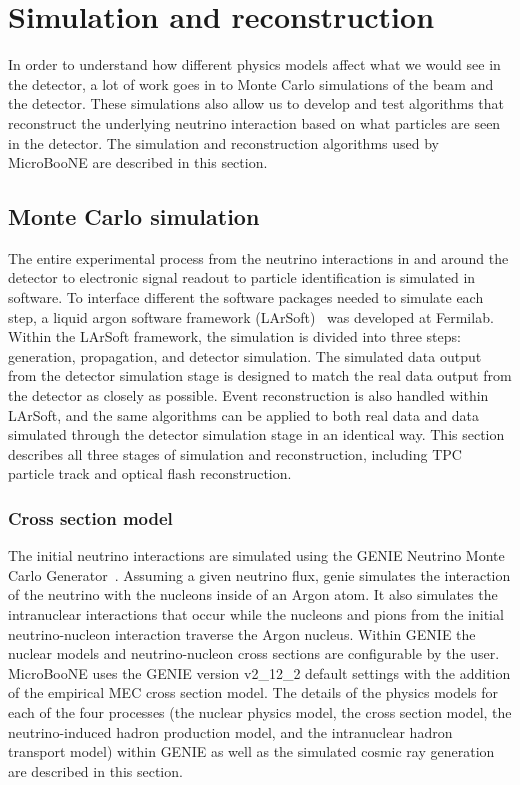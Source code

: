 \section{Simulation and reconstruction}\label{sc:simreco}
In order to understand how different physics models affect what we would see in
the detector, a lot of work goes in to Monte Carlo simulations of the beam and
the detector. These simulations also allow us to develop and test algorithms
that reconstruct the underlying neutrino interaction based on what particles
are seen in the detector. The simulation and reconstruction algorithms used by
MicroBooNE are described in this section.


\subsection{Monte Carlo simulation}\label{sec:simulation}
  The entire experimental process from the neutrino interactions in and around
  the detector to electronic signal readout to particle identification is
  simulated in software. To interface different the software packages needed to
  simulate each step, a liquid argon software framework (LArSoft)~\cite{larsoft}
  was developed at Fermilab. Within the LArSoft framework, the simulation is
  divided into three steps: generation, propagation, and detector simulation.
  The simulated data output from the detector simulation stage is designed to
  match the real data output from the detector as closely as possible. Event
  reconstruction is also handled within LArSoft, and the same algorithms can be
  applied to both real data and data simulated through the detector simulation
  stage in an identical way. This section describes all three stages of
  simulation and reconstruction, including TPC particle track and optical flash
  reconstruction.

  \subsubsection{Cross section model}\label{sec:geniexsec}
    The initial neutrino interactions are simulated using the GENIE Neutrino
    Monte Carlo Generator~\cite{Andreopoulos:2009rq,Andreopoulos:2015wxa}.
    Assuming a given neutrino flux, genie simulates the interaction of the
    neutrino with the nucleons inside of an Argon atom. It also simulates the
    intranuclear interactions that occur while the nucleons and pions from the
    initial neutrino-nucleon interaction traverse the Argon nucleus.  Within
    GENIE the nuclear models and neutrino-nucleon cross sections are
    configurable by the user.  MicroBooNE uses the GENIE version v2\_12\_2
    default settings with the addition of the empirical MEC cross section
    model. The details of the physics models for each of the four processes
    (the nuclear physics model, the cross section model, the neutrino-induced
    hadron production model, and the intranuclear hadron transport model)
    within GENIE as well as the simulated cosmic ray generation are described
    in this section.

